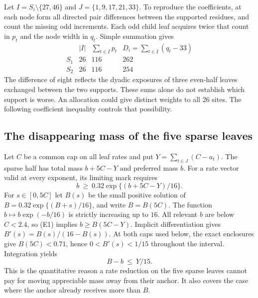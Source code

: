 \documentclass[12pt,letterpaper]{article}
\begin{document}
Let \(I=S_i\setminus\{27,46\}\) and \(J=\{1,9,17,21,33\}\). To reproduce the coefficients, at each node form all directed pair differences between the supported residues, and count the missing odd increments. Each odd child leaf acquires twice that count in \(p_t\) and the node width in \(q_t\). Simple summation gives
\[
 \begin{array}{c|c|c|c}
 & |I| & \sum_{t\in I}p_t & D_i=\sum_{t\in I}(q_t-33)\\ \hline
 S_1&26&116&262\\
 S_2&26&116&254
 \end{array}
\]
The difference of eight reflects the dyadic exposures of three even-half leaves exchanged between the two supports. These sums alone do not establish which support is worse. An allocation could give distinct weights to all 26 sites. The following coefficient inequality controls that possibility.

\subsection{The disappearing mass of the five sparse leaves}

Let \(C\) be a common cap on all leaf rates and put \(Y=\sum_{t\in J}(C-a_t)\). The sparse half has total mass \(b+5C-Y\) and preferred mass \(b\). For a rate vector valid at every exponent, its limiting mark requires
\[
 b\ \ge\ 0.32\exp\{(b+5C-Y)/16\}.
 \tag{E1}
\]
For \(s\in[0,5C]\) let \(B(s)\) be the small positive solution of \(B=0.32\exp\{(B+s)/16\}\), and write \(B=B(5C)\). The function \(b\mapsto b\exp(-b/16)\) is strictly increasing up to \(16\). All relevant \(b\) are below \(C<2.4\), so (E1) implies \(b\ge B(5C-Y)\). Implicit differentiation gives \(B'(s)=B(s)/(16-B(s))\). At both caps used below, the exact enclosures give \(B(5C)<0.71\), hence \(0<B'(s)<1/15\) throughout the interval. Integration yields
\[
 B-b\ \le\ Y/15.
 \tag{E2}
\]
This is the quantitative reason a rate reduction on the five sparse leaves cannot pay for moving appreciable mass away from their anchor. It also covers the case where the anchor already receives more than \(B\).
\end{document}
